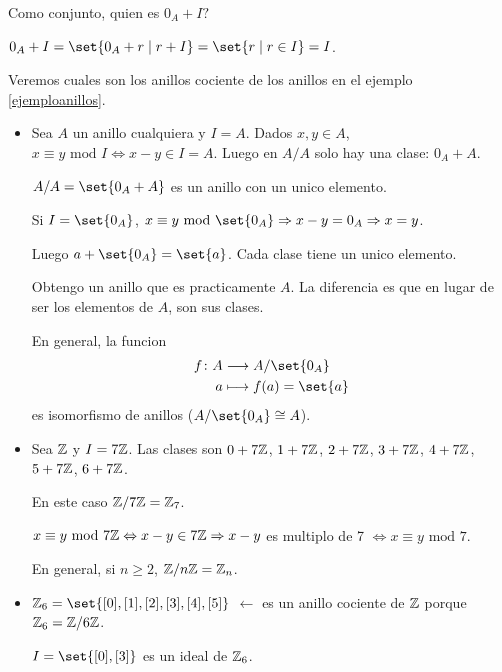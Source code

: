 \begin{remark}
	Como conjunto, quien es \(0_A + I ? \)
	
	\(0_A + I = \set{0_A + r \mid r + I} = \set{r \mid r \in I } = I \).
\end{remark}
\begin{example}
	Veremos cuales son los anillos cociente de los anillos en el ejemplo \ref{ejemploanillos}.
	
	\begin{itemize}
		\item Sea \(A \) un anillo cualquiera y \(I = A \). Dados \(x, y \in A \), \(x \equiv y \text{ mod } I \iff x - y \in I = A \). Luego en \(A/A \) solo hay una clase: \(0_A + A \).
		      
		      \(A/A = \set{0_A + A }\) es un anillo con un unico elemento.
		      
		      Si \(I = \set{0_A}\), \(x \equiv y \text{ mod } \set{0_A} \Rightarrow x - y = 0_A \Rightarrow x = y  \).
		      
		      Luego \(a + \set{0_A} = \set{a }\). Cada clase tiene un unico elemento.
		      
		      Obtengo un anillo que es practicamente \(A \). La diferencia es que en lugar de ser los elementos de \(A \), son sus clases.
		      
		      En general, la funcion
		      \[
			      \begin{aligned}
				      f \colon A & \longrightarrow A/\set{0_A }  \\
				      a          & \longmapsto f (a ) = \set{a }
			      \end{aligned}
		      \]
		      es isomorfismo de anillos (\(A/\set{0_A} \cong A\)).
		\item Sea \(\mathbb{Z} \) y \(I = 7\mathbb{Z} \). Las clases son \(0 + 7\mathbb{Z} \), \(1 + 7\mathbb{Z} \), \(2 + 7\mathbb{Z}  \), \(3 + 7\mathbb{Z} \), \(4 + 7\mathbb{Z} \), \(5 + 7\mathbb{Z} \), \(6 + 7\mathbb{Z} \).
		      
		      En este caso \(\mathbb{Z}/7\mathbb{Z} = \mathbb{Z}_7 \).
		      
		      \(x \equiv y \text{ mod } 7\mathbb{Z} \Leftrightarrow x - y \in 7\mathbb{Z} \Rightarrow x - y \) es multiplo de 7 \(\iff x \equiv y \text{ mod } 7 \).
		      
		      En general, si \(n \geq 2 \), \(\mathbb{Z}/n\mathbb{Z} = \mathbb{Z}_n \).
		      
		\item \(\Z_6 = \set{[0],[1],[2],[3],[4],[5]}\) \(\leftarrow \) es un anillo cociente de \(\mathbb{Z} \) porque \(\mathbb{Z}_6 = \mathbb{Z}/6\mathbb{Z} \).
		      
		      \(I = \set{[0], [3 ]}\) es un ideal de \(\mathbb{Z}_6 \).
		      

\end{itemize}
\end{example}

